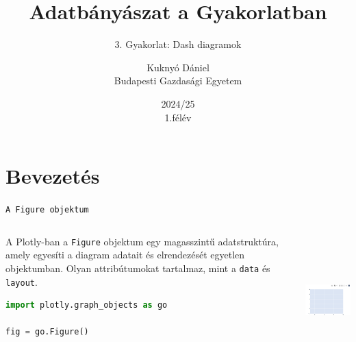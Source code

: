 \documentclass[english, aspectratio=169]{beamer}
\makeatletter
\newcommand\makebeamertitle{\frame{\maketitle}}
\let\origtableofcontents=\tableofcontents
\def\tableofcontents{\@ifnextchar[{\origtableofcontents}{\gobbletableofcontents}}
\def\gobbletableofcontents#1{\origtableofcontents}
\makeatother
\begin{document}
	\section{Bevezetés}
	\title[]{Adatbányászat a Gyakorlatban}
	\subtitle{3. Gyakorlat: Dash diagramok}
	\author[Kuknyó Dániel]{Kuknyó Dániel\\Budapesti Gazdasági Egyetem}
	\date{2024/25\\1.félév}
	\makebeamertitle
	
	\begin{frame}
	\tableofcontents{}
	\end{frame}
	
	\begin{frame}
	\tableofcontents[currentsection]
	\end{frame}
	
	\begin{frame}[fragile]{\texttt{A Figure objektum}}
		\begin{columns}
			\begin{column}{.5\textwidth}
				A Plotly-ban a \texttt{Figure} objektum egy magasszintű adatstruktúra, amely egyesíti a diagram adatait és elrendezését egyetlen objektumban. Olyan attribútumokat tartalmaz, mint a \texttt{data} és \texttt{layout}.
				\vspace{0.2cm}
				\begin{lstlisting}[language=python]
import plotly.graph_objects as go

fig = go.Figure()
				\end{lstlisting}
			\end{column}
			\begin{column}{.5\textwidth}
				\begin{center}
					\includegraphics[width=5cm, height=5cm, keepaspectratio]{images/plots_1.png}
				\end{center}
			\end{column}
		\end{columns}
	\end{frame}
	
\end{document}
